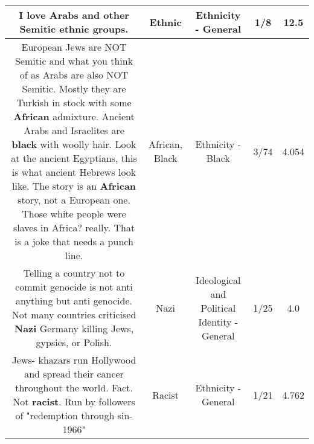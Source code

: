 \documentclass[11pt]{article}
\newlength\mylength
\begin{document}
\begin{center}
\begin{longtable}{|C{.65\mylength}|C{.30\mylength}|C{.12\mylength}|C{.12\mylength}|C{.12\mylength}|}
  \small I love Arabs and other Semitic \textbf{ethnic} groups.\normalsize   & Ethnic & Ethnicity - General & 1/8 & 12.5 \\  \hline
  \small European Jews are NOT Semitic and what you think of as Arabs are also NOT Semitic. Mostly they are Turkish in stock with some \textbf{African} admixture. Ancient Arabs and Israelites are \textbf{black} with woolly hair. Look at the ancient Egyptians, this is what ancient Hebrews look like. The story is an \textbf{African} story, not a European one. Those white people were slaves in Africa? really.  That is a joke that needs a punch line.\normalsize   & African, Black & Ethnicity - Black & 3/74 & 4.054 \\  \hline
  \small Telling a country not to commit genocide is not anti anything but anti genocide. Not many countries criticised \textbf{Nazi} Germany killing Jews, gypsies, or Polish.\normalsize   & Nazi &  Ideological and Political Identity - General & 1/25 & 4.0 \\  \hline
  \small Jews- khazars run Hollywood and spread their cancer throughout the world.  Fact. Not \textbf{racist}. Run by followers of "redemption through sin-1966"\normalsize   & Racist & Ethnicity - General & 1/21 & 4.762 \\  \hline

\end{longtable}
\end{center}
\end{document}
